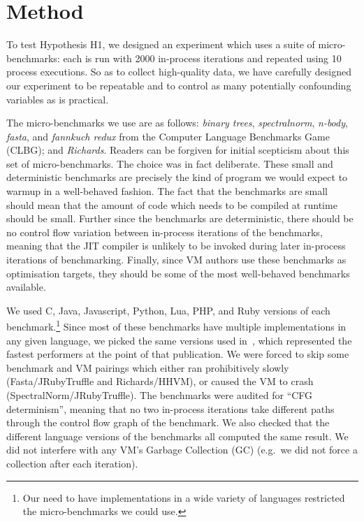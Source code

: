 \documentclass[preprint]{sigplanconf}
\newcommand{\hypone}{H1\xspace}
\newcommand{\binarytrees}{\emph{binary trees}\xspace}
\newcommand{\richards}{\emph{Richards}\xspace}
\newcommand{\spectralnorm}{\emph{spectralnorm}\xspace}
\newcommand{\nbody}{\emph{n-body}\xspace}
\newcommand{\fasta}{\emph{fasta}\xspace}
\newcommand{\fannkuch}{\emph{fannkuch redux}\xspace}
\begin{document}
\section{Method}
\label{sec:method}

To test Hypothesis \hypone, we designed an experiment which uses a suite of
micro-benchmarks: each is run with 2000 in-process iterations and repeated
using 10 process executions. So as
to collect high-quality data, we have carefully designed our
experiment to be repeatable and to control as many potentially confounding variables as
is practical.

The micro-benchmarks we use are as follows: \binarytrees, \spectralnorm,
\nbody, \fasta, and \fannkuch from the Computer Language Benchmarks Game
(CLBG); and \richards. Readers can be forgiven for initial scepticism about
this set of micro-benchmarks. The choice was in fact deliberate. These small
and deterministic benchmarks are precisely the kind of program we would expect
to warmup in a well-behaved fashion. The fact that the benchmarks are small
should mean that the amount of code which needs to be compiled at runtime
should be small. Further since the benchmarks are deterministic, there should
be no control flow variation between in-process iterations of the benchmarks,
meaning that the JIT compiler is unlikely to be invoked during later in-process
iterations of benchmarking. Finally, since VM authors use these benchmarks as
optimisation targets, they should be some of the most well-behaved benchmarks
available.

We used C, Java, Javascript, Python, Lua, PHP,
and Ruby versions of each benchmark.\footnote{Our need to have implementations in a wide variety
of languages restricted the micro-benchmarks we could use.} Since most of these
benchmarks have multiple implementations in any given language, we picked
the same versions used in~\cite{bolz14impact}, which represented the fastest
performers at the point of that publication. We were forced to skip some
benchmark and VM pairings which either ran prohibitively slowly
(Fasta/JRubyTruffle and Richards/HHVM), or caused the VM to crash
(SpectralNorm/JRubyTruffle). The benchmarks were audited for ``CFG
determinism'', meaning that no two in-process iterations take different paths
through the control flow graph of the benchmark. We also checked that the
different language versions of the benchmarks all computed the same result.
We did not interfere with any VM's Garbage
Collection (GC) (e.g.~we did not force a collection after each iteration).
\end{document}
